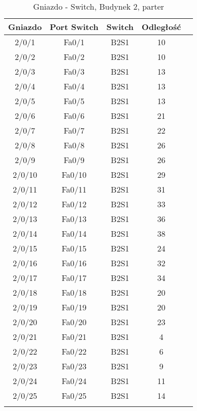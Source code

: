 \begin{center}
    \begin{longtable}{|c|c|c|c|c|}
    \hline
    Gniazdo & Port Switch & Switch & Odległość \\ \hline
	2/0/1 & Fa0/1 & B2S1 & 10 \\ \hline
	2/0/2 & Fa0/2 & B2S1 & 10 \\ \hline
	2/0/3 & Fa0/3 & B2S1 & 13 \\ \hline
	2/0/4 & Fa0/4 & B2S1 & 13 \\ \hline
	2/0/5 & Fa0/5 & B2S1 & 13 \\ \hline
	2/0/6 & Fa0/6 & B2S1 & 21 \\ \hline
	2/0/7 & Fa0/7 & B2S1 & 22 \\ \hline
	2/0/8 & Fa0/8 & B2S1 & 26 \\ \hline
	2/0/9 & Fa0/9 & B2S1 & 26 \\ \hline
	2/0/10 & Fa0/10 & B2S1 & 29 \\ \hline
	2/0/11 & Fa0/11 & B2S1 & 31 \\ \hline
	2/0/12 & Fa0/12 & B2S1 & 33 \\ \hline
	2/0/13 & Fa0/13 & B2S1 & 36 \\ \hline
	2/0/14 & Fa0/14 & B2S1 & 38 \\ \hline
	2/0/15 & Fa0/15 & B2S1 & 24 \\ \hline
	2/0/16 & Fa0/16 & B2S1 & 32 \\ \hline
	2/0/17 & Fa0/17 & B2S1 & 34 \\ \hline
	2/0/18 & Fa0/18 & B2S1 & 20 \\ \hline
	2/0/19 & Fa0/19 & B2S1 & 20 \\ \hline
	2/0/20 & Fa0/20 & B2S1 & 23 \\ \hline
	2/0/21 & Fa0/21 & B2S1 & 4 \\ \hline
	2/0/22 & Fa0/22 & B2S1 & 6 \\ \hline
	2/0/23 & Fa0/23 & B2S1 & 9 \\ \hline
	2/0/24 & Fa0/24 & B2S1 & 11 \\ \hline
	2/0/25 & Fa0/25 & B2S1 & 14 \\ \hline
	\caption{Gniazdo - Switch, Budynek 2, parter}\\
    \end{longtable}
\end{center}

